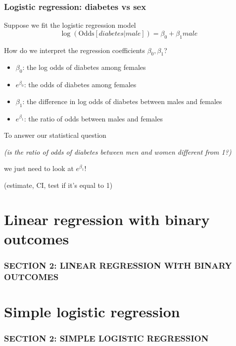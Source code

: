 \documentclass[12pt, 
hyperref={colorlinks=true, linkcolor=blue, urlcolor=cyan}]{beamer}
\begin{document}
\begin{frame}
\frametitle{Logistic regression: diabetes vs sex}

Suppose we fit the logistic regression model $$\log\left(\text{Odds}[diabetes | male]\right) = \beta_0 + \beta_1 male$$

\vspace{-0.2cm}

How do we interpret the regression coefficients $\beta_0, \beta_1$? \vspace{-0.3cm}
\begin{itemize}
\item $\beta_0$: \pause the log odds of diabetes among females \pause
\item[] \color{blue} $e^{\beta_0}$: the odds of diabetes among females \pause \color{black}
\item $\beta_1$: \pause the difference in log odds of diabetes between males and females \pause 
\item[] \color{blue} $e^{\beta_1}$: the ratio of odds between males and females \color{black}
\end{itemize}

\vspace{-0.2cm}
To answer our statistical question \begin{small}\textit{(is the ratio of odds of diabetes between men and women different from 1?)}\end{small} we just need to look at $e^{\beta_1}$! \begin{small} (estimate, CI, test if it's equal to 1) \end{small}
\end{frame}



\section{Linear regression with binary outcomes}
\begin{frame}
\frametitle{SECTION 2: LINEAR REGRESSION WITH BINARY OUTCOMES}


\end{frame}



\section{Simple logistic regression}
\begin{frame}
\frametitle{SECTION 2: SIMPLE LOGISTIC REGRESSION}






\end{frame}
\end{document}
